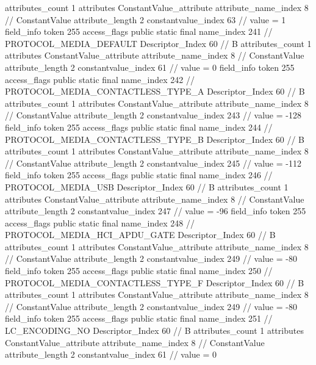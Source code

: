 {{{{{				attributes_count	1
				attributes {
				ConstantValue_attribute {
					attribute_name_index	8		// ConstantValue
					attribute_length	2
					constantvalue_index	63		// value = 1
				}
				}
			}
			field_info {
				token	255
				access_flags	public static final
				name_index	241		// PROTOCOL_MEDIA_DEFAULT
				Descriptor_Index	60		// B
				attributes_count	1
				attributes {
				ConstantValue_attribute {
					attribute_name_index	8		// ConstantValue
					attribute_length	2
					constantvalue_index	61		// value = 0
				}
				}
			}
			field_info {
				token	255
				access_flags	public static final
				name_index	242		// PROTOCOL_MEDIA_CONTACTLESS_TYPE_A
				Descriptor_Index	60		// B
				attributes_count	1
				attributes {
				ConstantValue_attribute {
					attribute_name_index	8		// ConstantValue
					attribute_length	2
					constantvalue_index	243		// value = -128
				}
				}
			}
			field_info {
				token	255
				access_flags	public static final
				name_index	244		// PROTOCOL_MEDIA_CONTACTLESS_TYPE_B
				Descriptor_Index	60		// B
				attributes_count	1
				attributes {
				ConstantValue_attribute {
					attribute_name_index	8		// ConstantValue
					attribute_length	2
					constantvalue_index	245		// value = -112
				}
				}
			}
			field_info {
				token	255
				access_flags	public static final
				name_index	246		// PROTOCOL_MEDIA_USB
				Descriptor_Index	60		// B
				attributes_count	1
				attributes {
				ConstantValue_attribute {
					attribute_name_index	8		// ConstantValue
					attribute_length	2
					constantvalue_index	247		// value = -96
				}
				}
			}
			field_info {
				token	255
				access_flags	public static final
				name_index	248		// PROTOCOL_MEDIA_HCI_APDU_GATE
				Descriptor_Index	60		// B
				attributes_count	1
				attributes {
				ConstantValue_attribute {
					attribute_name_index	8		// ConstantValue
					attribute_length	2
					constantvalue_index	249		// value = -80
				}
				}
			}
			field_info {
				token	255
				access_flags	public static final
				name_index	250		// PROTOCOL_MEDIA_CONTACTLESS_TYPE_F
				Descriptor_Index	60		// B
				attributes_count	1
				attributes {
				ConstantValue_attribute {
					attribute_name_index	8		// ConstantValue
					attribute_length	2
					constantvalue_index	249		// value = -80
				}
				}
			}
			field_info {
				token	255
				access_flags	public static final
				name_index	251		// LC_ENCODING_NO
				Descriptor_Index	60		// B
				attributes_count	1
				attributes {
				ConstantValue_attribute {
					attribute_name_index	8		// ConstantValue
					attribute_length	2
					constantvalue_index	61		// value = 0
}}}}}}}
